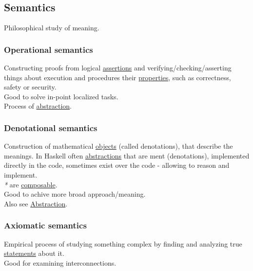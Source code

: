 \documentclass[11pt]{article}
\begin{document}
\subsection{\label{orgbbcc036}Semantics}
\label{sec:org34cd7f3}
Philosophical study of meaning.\\

\subsubsection{\label{org91a1a09}Operational semantics}
\label{sec:orga4b4de8}
Constructing proofs from logical \hyperref[org49a769a]{assertions} and verifying/checking/asserting things about execution and procedures their \hyperref[org85fb3a1]{properties}, such as correctness, safety or security.\\

Good to solve in-point localized tasks.\\

Process of \hyperref[org3470ee4]{abstraction}.\\

\subsubsection{\label{orgd3cd3fc}Denotational semantics}
\label{sec:orgc6cf7b1}
Construction of mathematical \hyperref[org363acc2]{objects} (called denotations), that describe the meanings. In Haskell often \hyperref[orgc16d079]{abstractions} that are ment (denotations), implemented directly in the code, sometimes exist over the code - allowing to reason and implement.\\

\emph{*} are \hyperref[org99d574f]{composable}.\\

Good to achive more broad approach/meaning.\\

Also see \hyperref[org3470ee4]{Abstraction}.\\

\subsubsection{\label{org2c89d0c}Axiomatic semantics}
\label{sec:org806deff}
Empirical process of studying something complex by finding and analyzing true \hyperref[org0c99cef]{statements} about it.\\

Good for examining interconnections.\\
\end{document}
